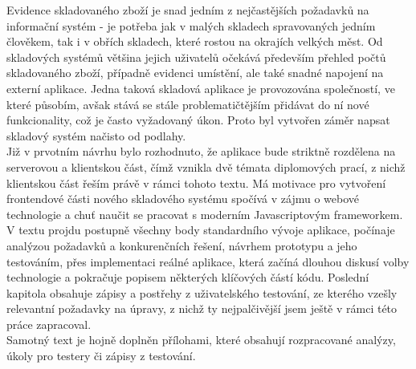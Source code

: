 Evidence skladovaného zboží je snad jedním z nejčastějších požadavků na informační systém - je potřeba jak v malých skladech spravovaných jedním člověkem, tak i v obřích skladech, které rostou na okrajích velkých měst. Od skladových systémů většina jejich uživatelů očekává především přehled počtů skladovaného zboží, případně evidenci umístění, ale také snadné napojení na externí aplikace. Jedna taková skladová aplikace je provozována společností, ve které působím, avšak stává se stále problematičtějším přidávat do ní nové funkcionality, což je často vyžadovaný úkon. Proto byl vytvořen záměr napsat skladový systém načisto od podlahy.\\
Již v prvotním návrhu bylo rozhodnuto, že aplikace bude striktně rozdělena na serverovou a klientskou část, čímž vznikla dvě témata diplomových prací, z nichž klientskou část řeším právě v rámci tohoto textu. Má motivace pro vytvoření frontendové části nového skladového systému spočívá v zájmu o webové technologie a chuť naučit se pracovat s moderním Javascriptovým frameworkem.\\
V textu projdu postupně všechny body standardního vývoje aplikace, počínaje analýzou požadavků a konkurenčních řešení, návrhem prototypu a jeho testováním, přes implementaci reálné aplikace, která začíná dlouhou diskusí volby technologie a pokračuje popisem některých klíčových částí kódu. Poslední kapitola obsahuje zápisy a postřehy z uživatelského testování, ze kterého vzešly relevantní požadavky na úpravy, z nichž ty nejpalčivější jsem ještě v rámci této práce zapracoval.\\
Samotný text je hojně doplněn přílohami, které obsahují rozpracované analýzy, úkoly pro testery či zápisy z testování.
